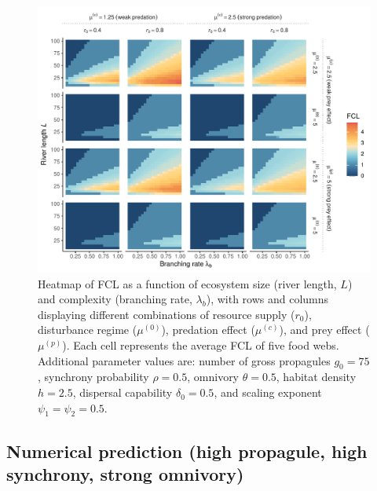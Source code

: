 \begin{figure}
\centering
\includegraphics{../data_fmt/fig_rho05_g75_theta05.pdf}
\caption{Heatmap of FCL as a function of ecosystem size (river length,
\(L\)) and complexity (branching rate, \(\lambda_b\)), with rows and
columns displaying different combinations of resource supply (\(r_0\)),
disturbance regime (\(\mu^{(0)}\)), predation effect (\(\mu^{(c)}\)),
and prey effect (\(\mu^{(p)}\)). Each cell represents the average FCL of
five food webs. Additional parameter values are: number of gross
propagules \(g_0=75\), synchrony probability \(\rho=0.5\), omnivory
\(\theta=0.5\), habitat density \(h=2.5\), dispersal capability
\(\delta_0=0.5\), and scaling exponent \(\psi_1=\psi_2=0.5\).}
\end{figure}

\newpage

\subsection{Numerical prediction (high propagule, high synchrony, strong
omnivory)}\label{numerical-prediction-high-propagule-high-synchrony-strong-omnivory}

